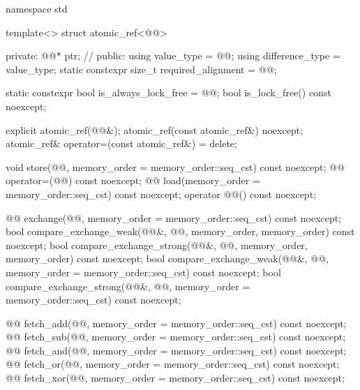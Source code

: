 \begin{codeblock}
namespace std {
  template<> struct atomic_ref<@@> {
  private:
    @@* ptr;        // \expos
  public:
    using value_type = @@;
    using difference_type = value_type;
    static constexpr size_t required_alignment = @@;

    static constexpr bool is_always_lock_free = @@;
    bool is_lock_free() const noexcept;

    explicit atomic_ref(@@&);
    atomic_ref(const atomic_ref&) noexcept;
    atomic_ref& operator=(const atomic_ref&) = delete;

    void store(@@, memory_order = memory_order::seq_cst) const noexcept;
    @@ operator=(@@) const noexcept;
    @@ load(memory_order = memory_order::seq_cst) const noexcept;
    operator @@() const noexcept;

    @@ exchange(@@,
                      memory_order = memory_order::seq_cst) const noexcept;
    bool compare_exchange_weak(@@&, @@,
                               memory_order, memory_order) const noexcept;
    bool compare_exchange_strong(@@&, @@,
                                 memory_order, memory_order) const noexcept;
    bool compare_exchange_weak(@@&, @@,
                               memory_order = memory_order::seq_cst) const noexcept;
    bool compare_exchange_strong(@@&, @@,
                                 memory_order = memory_order::seq_cst) const noexcept;

    @@ fetch_add(@@,
                       memory_order = memory_order::seq_cst) const noexcept;
    @@ fetch_sub(@@,
                       memory_order = memory_order::seq_cst) const noexcept;
    @@ fetch_and(@@,
                       memory_order = memory_order::seq_cst) const noexcept;
    @@ fetch_or(@@,
                      memory_order = memory_order::seq_cst) const noexcept;
    @@ fetch_xor(@@,
                       memory_order = memory_order::seq_cst) const noexcept;

}}
\end{codeblock}
